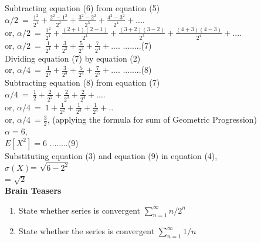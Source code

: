 \documentclass[11pt,fleqn]{book} %
\begin{document}
Subtracting equation (6) from equation (5)\\

$\alpha/2\ =\ \frac{1^2}{2^1} + \frac{2^2-1^2}{2^2} + \frac{3^2-2^2}{2^3} + \frac{4^2-3^2}{2^4} + .... $    \\


or, $\alpha/2\ =\ \frac{1^2}{2^1} + \frac{(2+1)(2-1)}{2^2} + \frac{(3+2)(3-2)}{2^3} + \frac{(4+3)(4-3)}{2^4} + .... $    \\


or, $\alpha/2\ =\ \frac{1}{2^1} + \frac{3}{2^2} + \frac{5}{2^3} + \frac{7}{2^4} + .... $     \hspace{5mm} ........(7)\\	

Dividing equation (7) by equation (2)\\

 or, $\alpha/4\ =\ \frac{1}{2^2} + \frac{3}{2^3} + \frac{5}{2^4} + \frac{7}{2^5} + .... $  \hspace{5mm} ........(8)\\
 
 Subtracting equation (8) from equation (7)\\
 
$\alpha/4\ =\ \frac{1}{2} + \frac{2}{2^2} + \frac{2}{2^3} + \frac{2}{2^4} + .... $\\

or, $\alpha/4\ =\ 1 + \frac{1}{2^2} + \frac{1}{2^3} + \frac{1}{2^4} + .. $\\ 

or, $\alpha/4\ =\frac{3}{2}$, (applying the formula for sum of Geometric Progression)\\

$\alpha = 6$, \\

$E[X^2]=6$	\hspace{5mm} ........(9)\\

Substituting equation (3) and equation (9) in equation (4), \\

$\sigma(X)$=  $ \sqrt{6- 2 ^ 2} $\\

= $\sqrt{2}$\\

	
\textbf{Brain Teasers}
\begin{enumerate}
\item State whether series is convergent $\sum_{n=1}^{\infty} n/2^{n} $
\item State whether the series is convergent $\sum_{n=1}^{\infty} 1/n$ 
\end{enumerate}
\end{document}
